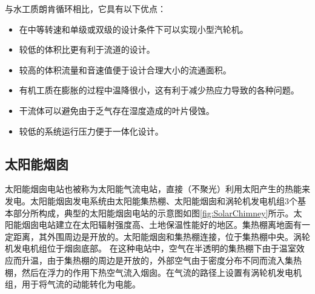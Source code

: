 与水工质朗肯循环相比，它具有以下优点：
\begin{itemize}
	\item 在中等转速和单级或双级的设计条件下可以实现小型汽轮机。
    \item 较低的体积比更有利于流道的设计。
    \item 较高的体积流量和音速值便于设计合理大小的流通面积。
    \item 有机工质在膨胀的过程中温降很小，这有利于减少热应力导致的各种问题。
	\item 干流体可以避免由于乏气存在湿度造成的叶片侵蚀。
	\item 较低的系统运行压力便于一体化设计。
  \end{itemize}

\subsection{太阳能烟囱}
\label{sec:sc}
太阳能烟囱电站也被称为太阳能气流电站，直接（不聚光）利用太阳产生的热能来发电。太阳能烟囱发电系统由太阳能集热棚、太阳能烟囱和涡轮机发电机组3个基本部分所构成，典型的太阳能烟囱电站的示意图如图\ref{fig:SolarChimney}所示。太阳能烟囱电站建立在太阳辐射强度高、土地保温性能好的地区。集热棚离地面有一定距离，其外围周边是开放的。太阳能烟囱和集热棚连接，位于集热棚中央。涡轮机发电机组位于烟囱底部。
在这种电站中，空气在半透明的集热棚下由于温室效应而升温，由于集热棚的周边是开放的，外部空气由于密度分布不同而流入集热棚，然后在浮力的作用下热空气流入烟囱。在气流的路径上设置有涡轮机发电机组，用于将气流的动能转化为电能。

